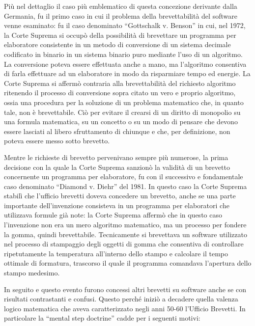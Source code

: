 Più nel dettaglio il caso più emblematico di questa concezione derivante dalla Germania, fu il primo caso in cui il problema della brevettabilità del software venne esaminato: fu il caso denominato ``Gottschalk v. Benson'' in cui, nel 1972, la Corte Suprema si occupò della possibilità di brevettare un programma per elaboratore consistente in un metodo di conversione di un sistema decimale codificato in binario in un sistema binario puro mediante l'uso di un algoritmo. La conversione poteva essere effettuata anche a mano, ma l'algoritmo consentiva di farla effettuare ad un elaboratore in modo da risparmiare tempo ed energie. La Corte Suprema si affermò contraria alla brevettabilità del richiesto algoritmo ritenendo il processo di conversione sopra citato un vero e proprio algoritmo, ossia una procedura per la soluzione di un problema matematico che, in quanto tale, non è brevettabile. Ciò per evitare il crearsi di un diritto di monopolio su una formula matematica, su un concetto o su un modo di pensare che devono essere lasciati al libero sfruttamento di chiunque e che, per definizione, non poteva essere messo sotto brevetto.

Mentre le richieste di brevetto pervenivano sempre più numerose, la prima decisione con la quale la Corte Suprema sanzionò la validità di un brevetto concernente un programma per elaboratore, fu con il successivo e fondamentale caso denominato ``Diamond v. Diehr'' del 1981. In questo caso la Corte Suprema stabilì che l'ufficio brevetti doveva concedere un brevetto, anche se una parte importante dell'invenzione consisteva in un programma per elaboratori che utilizzava formule già note: la Corte Suprema affermò che in questo caso l'invenzione non era un mero algoritmo matematico, ma un processo per fondere la gomma, quindi brevettabile. Tecnicamente si brevettava un software utilizzato nel processo di stampaggio degli oggetti di gomma che consentiva di controllare ripetutamente la temperatura all'interno dello stampo e calcolare il tempo ottimale di formatura, trascorso il quale il programma comandava l'apertura dello stampo medesimo.

In seguito e questo evento furono concessi altri brevetti su software anche se con risultati contrastanti e confusi. Questo perché iniziò a decadere quella valenza logico matematica che aveva caratterizzato negli anni 50-60 l'Ufficio Brevetti. In particolare  la ``mental step doctrine'' cadde per i seguenti motivi:

